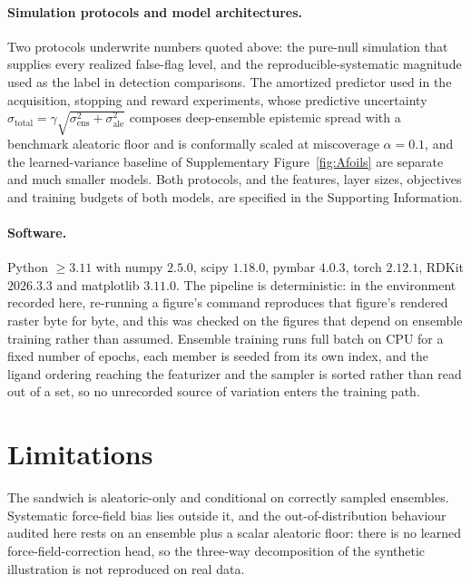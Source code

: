 \paragraph{Simulation protocols and model architectures.} Two protocols underwrite numbers quoted
above: the pure-null simulation that supplies every realized false-flag level, and the
reproducible-systematic magnitude used as the label in detection comparisons. The amortized
predictor used in the acquisition, stopping and reward experiments, whose predictive uncertainty
$\sigma_{\text{total}}=\gamma\sqrt{\sigma^2_{\text{ens}}+\sigma^2_{\text{ale}}}$ composes
deep-ensemble epistemic spread with a benchmark aleatoric floor and is conformally scaled at
miscoverage $\alpha=0.1$, and the learned-variance baseline of Supplementary
Figure~\ref{fig:Afoils} are separate and much smaller models. Both protocols, and the
features, layer sizes, objectives and training budgets of both models, are specified in the
Supporting Information.

\paragraph{Software.} Python $\geq3.11$ with numpy $2.5.0$, scipy $1.18.0$, pymbar $4.0.3$, torch
$2.12.1$, RDKit $2026.3.3$ and matplotlib $3.11.0$. The pipeline is deterministic: in the
environment recorded here, re-running a figure's command reproduces that figure's rendered raster
byte for byte, and this was checked on the figures that depend on ensemble training rather than
assumed. Ensemble training runs full batch on CPU for a fixed number of epochs, each member is
seeded from its own index, and the ligand ordering reaching the featurizer and the sampler is
sorted rather than read out of a set, so no unrecorded source of variation enters the training
path.

\section{Limitations}\label{sec:limitations}
The sandwich is aleatoric-only and conditional on correctly sampled ensembles. Systematic
force-field bias lies outside it, and the out-of-distribution behaviour audited here rests on an
ensemble plus a scalar aleatoric floor: there is no learned force-field-correction head, so the
three-way decomposition of the synthetic illustration is not reproduced on real data.

